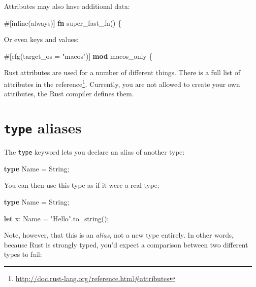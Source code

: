 \documentclass[a4paper,]{book}
\newenvironment{Shaded}{\begin{snugshade}}{\end{snugshade}}
\newcommand{\KeywordTok}[1]{\textcolor[rgb]{0.13,0.29,0.53}{\textbf{{#1}}}}
\newcommand{\StringTok}[1]{\textcolor[rgb]{0.31,0.60,0.02}{{#1}}}
\newcommand{\OtherTok}[1]{\textcolor[rgb]{0.56,0.35,0.01}{{#1}}}
\newcommand{\NormalTok}[1]{{#1}}
\renewcommand{\href}[2]{#2\footnote{\url{#1}}}
\begin{document}
Attributes may also have additional data:

\begin{Shaded}
\begin{Highlighting}[]
\OtherTok{#[}\NormalTok{inline}\OtherTok{(}\NormalTok{always}\OtherTok{)]}
\KeywordTok{fn} \NormalTok{super_fast_fn() \{}
\end{Highlighting}
\end{Shaded}

Or even keys and values:

\begin{Shaded}
\begin{Highlighting}[]
\OtherTok{#[}\NormalTok{cfg}\OtherTok{(}\NormalTok{target_os }\OtherTok{=} \StringTok{"macos"}\OtherTok{)]}
\KeywordTok{mod} \NormalTok{macos_only \{}
\end{Highlighting}
\end{Shaded}

Rust attributes are used for a number of different things. There is a
full list of attributes
\href{http://doc.rust-lang.org/reference.html\#attributes}{in the
reference}. Currently, you are not allowed to create your own
attributes, the Rust compiler defines them.

\section{\texorpdfstring{\texttt{type}
aliases}{type aliases}}\label{sec--type-aliases}

The \texttt{type} keyword lets you declare an alias of another type:

\begin{Shaded}
\begin{Highlighting}[]
\KeywordTok{type} \NormalTok{Name = String;}
\end{Highlighting}
\end{Shaded}

You can then use this type as if it were a real type:

\begin{Shaded}
\begin{Highlighting}[]
\KeywordTok{type} \NormalTok{Name = String;}

\KeywordTok{let} \NormalTok{x: Name = }\StringTok{"Hello"}\NormalTok{.to_string();}
\end{Highlighting}
\end{Shaded}

Note, however, that this is an \emph{alias}, not a new type entirely. In
other words, because Rust is strongly typed, you'd expect a comparison
between two different types to fail:
\end{document}
